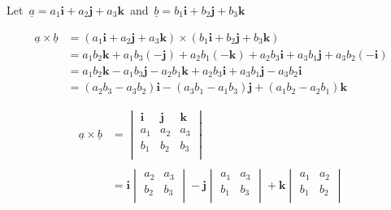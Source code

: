 \documentclass[11pt,a4paper]{article}
\theoremstyle{definition}
\begin{document}
Let $\, \underline{a} = a_1 \textbf{i} + a_2\textbf{j} + a_3\textbf{k}\,$ and  $\, \underline{b} = b_1 \textbf{i} + b_2\textbf{j} + b_3\textbf{k}\,$

\begin{align*}
\underline{a}\times \underline{b} & = \left( a_1 \textbf{i} + a_2\textbf{j} + a_3\textbf{k}\right)\times \left(b_1 \textbf{i} + b_2\textbf{j} + b_3\textbf{k}\right)\\
& = a_1b_2\textbf{k} +  a_1b_3\left(-\textbf{j}\right) +  a_2b_1\left(-\textbf{k}\right) +  a_2b_3\textbf{i}  +  a_3b_1\textbf{j}  +  a_3b_2\left(-\textbf{i} \right)\\
& = a_1b_2\textbf{k} -  a_1b_3\textbf{j} - a_2b_1\textbf{k} +  a_2b_3\textbf{i}  +  a_3b_1\textbf{j}  -  a_3b_2\textbf{i}\\
& = \left(a_2b_3 - a_3b_2\right)\textbf{i} - \left(a_3b_1 - a_1b_3\right)\textbf{j}  + \left(a_1b_2 - a_2b_1\right)\textbf{k} 
\end{align*}






\begin{align*}
\underline{a}\times \underline{b} & = \begin{vmatrix}
\textbf{i} & \textbf{j} & \textbf{k}\\
a_1 & a_2 & a_3\\
b_1 & b_2 & b_3\\
\end{vmatrix}\\\\
& = \textbf{i}\begin{vmatrix}
a_2 & a_3\\
b_2 & b_3\\
\end{vmatrix} - \textbf{j}\begin{vmatrix}
a_1 & a_3\\
b_1 & b_3\\
\end{vmatrix} + \textbf{k}\begin{vmatrix}
a_1 & a_2\\
b_1 & b_2\\
\end{vmatrix}\\
\end{align*}
\end{document}
